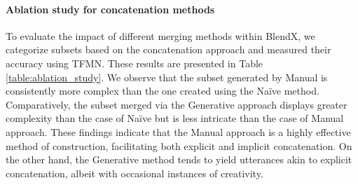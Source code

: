 \paragraph{Ablation study for concatenation methods}
To evaluate the impact of different merging methods within BlendX, we categorize subsets based on the concatenation approach and measured their accuracy using TFMN. 
These results are presented in Table \ref{table:ablation_study}. 
We observe that the subset generated by Manual is consistently more complex than the one created using the Na\"ive method. 
Comparatively, the subset merged via the Generative approach displays greater complexity than the case of Na\"ive but is less intricate than the case of Manual approach. 
These findings indicate that the Manual approach is a highly effective method of construction, facilitating both explicit and implicit concatenation. 
On the other hand, the Generative method tends to yield utterances akin to explicit concatenation, albeit with occasional instances of creativity.